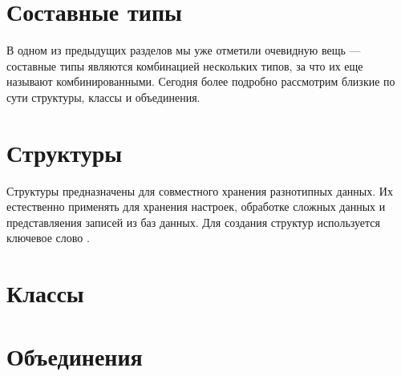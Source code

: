 \documentclass[book.tex]{subfiles}
\begin{document}



\maketitle

\section*{Составные типы}

В одном из предыдущих разделов мы уже отметили очевидную вещь --- составные типы являются комбинацией нескольких типов, за что их еще называют комбинированными. Сегодня более подробно рассмотрим близкие по сути структуры, классы и объединения.

\section*{Структуры}

Структуры предназначены для совместного хранения разнотипных данных. Их естественно применять для хранения настроек, обработке сложных данных и представляения записей из баз данных. Для создания структур используется ключевое слово .

\section*{Классы}

\section*{Объединения}
\end{document}
